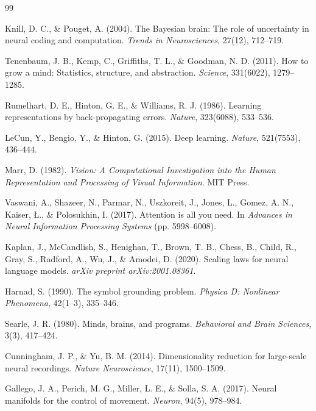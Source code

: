 \documentclass{article}
\begin{document}
\begin{thebibliography}{99}

Knill, D. C., \& Pouget, A. (2004).
The Bayesian brain: The role of uncertainty in neural coding and computation.
\textit{Trends in Neurosciences}, 27(12), 712--719.

Tenenbaum, J. B., Kemp, C., Griffiths, T. L., \& Goodman, N. D. (2011).
How to grow a mind: Statistics, structure, and abstraction.
\textit{Science}, 331(6022), 1279--1285.

Rumelhart, D. E., Hinton, G. E., \& Williams, R. J. (1986).
Learning representations by back-propagating errors.
\textit{Nature}, 323(6088), 533--536.

LeCun, Y., Bengio, Y., \& Hinton, G. (2015).
Deep learning.
\textit{Nature}, 521(7553), 436--444.

Marr, D. (1982).
\textit{Vision: A Computational Investigation into the Human Representation and Processing of Visual Information}.
MIT Press.

Vaswani, A., Shazeer, N., Parmar, N., Uszkoreit, J., Jones, L., Gomez, A. N., Kaiser, {\L}., \& Polosukhin, I. (2017).
Attention is all you need.
In \textit{Advances in Neural Information Processing Systems} (pp. 5998--6008).

Kaplan, J., McCandlish, S., Henighan, T., Brown, T. B., Chess, B., Child, R., Gray, S., Radford, A., Wu, J., \& Amodei, D. (2020).
Scaling laws for neural language models.
\textit{arXiv preprint arXiv:2001.08361}.

Harnad, S. (1990).
The symbol grounding problem.
\textit{Physica D: Nonlinear Phenomena}, 42(1--3), 335--346.

Searle, J. R. (1980).
Minds, brains, and programs.
\textit{Behavioral and Brain Sciences}, 3(3), 417--424.

Cunningham, J. P., \& Yu, B. M. (2014).
Dimensionality reduction for large-scale neural recordings.
\textit{Nature Neuroscience}, 17(11), 1500--1509.

Gallego, J. A., Perich, M. G., Miller, L. E., \& Solla, S. A. (2017).
Neural manifolds for the control of movement.
\textit{Neuron}, 94(5), 978--984.


\end{thebibliography}
\end{document}
